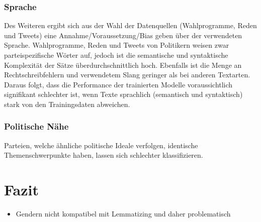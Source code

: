 \subsubsection{Sprache}


Des Weiteren ergibt sich aus der Wahl der Datenquellen (Wahlprogramme, Reden und Tweets) eine Annahme/Voraussetzung/Bias geben über der verwendeten Sprache. Wahlprogramme, Reden und Tweets von Politikern weisen zwar parteispezifische Wörter auf, jedoch ist die semantische und syntaktische Komplexität der Sätze überdurchschnittlich hoch. Ebenfalls ist die Menge an Rechtschreibfehlern und verwendetem Slang geringer als bei anderen Textarten. Daraus folgt, dass die Performance der trainierten Modelle voraussichtlich signifikant schlechter ist, wenn Texte sprachlich (semantisch und syntaktisch) stark von den Trainingsdaten abweichen.

\subsubsection{Politische Nähe}


Parteien, welche ähnliche politische Ideale verfolgen, identische Themenschwerpunkte haben, lassen sich schlechter klassifizieren.

\section{Fazit} \label{sec:crispConclusion}

\begin{itemize}
    \item Gendern nicht kompatibel mit Lemmatizing und daher problematisch
\end{itemize}
